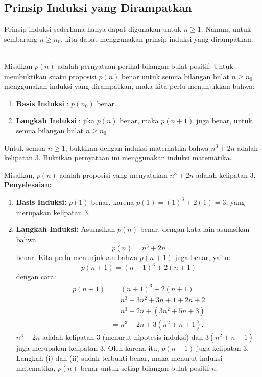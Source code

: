 \documentclass[11pt]{article}
\theoremstyle{definitionstyle}
\theoremstyle{theoremstyle}
\theoremstyle{examplestyle}
\begin{document}
\subsection{Prinsip Induksi yang Dirampatkan}
Prinsip induksi sederhana hanya dapat digunakan untuk $n \ge 1$. Namun, untuk sembarang $n \ge n_0$, kita dapat menggunakan prinsip induksi yang dirampatkan.
\begin{theorem} \hfill \\
    Misalkan $p(n)$ adalah pernyataan perihal bilangan bulat positif. Untuk membuktikan suatu proposisi $p(n)$ benar untuk semua bilangan bulat $n \ge n_0$ menggunakan induksi yang dirampatkan, maka kita perlu menunjukkan bahwa:
    \begin{enumerate}[left=0pt, itemsep=1.5pt, topsep=1.5pt, label=\roman*), leftmargin=1.5em]
        \item \textbf{Basis Induksi}    : $p(n_0)$ benar.
        \item \textbf{Langkah Induksi}  : jika $p(n)$ benar, maka $p(n+1)$ juga benar, untuk semua bilangan bulat $n \ge n_0$
    \end{enumerate}
\end{theorem}

\begin{example}
    Untuk semua $n \ge 1$, buktikan dengan induksi matematika bahwa $n^3 + 2n$ adalah kelipatan 3. Buktikan pernyataan ini menggunakan induksi matematika.
\end{example}
Misalkan, $p(n)$ adalah proposisi yang menyatakan $n^3 + 2n$ adalah kelipatan 3. \\
\textbf{Penyelesaian: }
\begin{enumerate}[left=0pt, itemsep=1.5pt, topsep=1.5pt, label=\roman*), leftmargin=1.5em]
    \item \textbf{Basis Induksi:} $p(1)$ benar, karena $p(1) = (1)^3 + 2(1) = 3$, yang merupakan kelipatan 3.
    \item \textbf{Langkah Induksi: } Asumsikan $p(n)$ benar, dengan kata lain asumsikan bahwa
    $$p(n) = n^3 + 2n$$
    benar. Kita perlu menunjukkan bahwa $p(n+1)$ juga benar, yaitu:
    $$p(n+1) = (n + 1)^3 + 2(n + 1)$$
    dengan cara:
    \begin{align*}
        p(n+1) &= (n + 1)^3 + 2(n + 1) \\
        &= n^3 + 3n^2 + 3n + 1 + 2n + 2 \\
        &= n^3 + 2n + (3n^2 + 5n + 3) \\ 
        &= n^3 + 2n + 3(n^2 + n + 1).
    \end{align*}
    $n^3 + 2n$ adalah kelipatan 3 (menurut hipotesis induksi) dan $3(n^2 + n + 1)$ juga merupakan kelipatan 3. Oleh karena itu, $p(n + 1)$ juga kelipatan 3. \\
    Langkah (i) dan (ii) sudah terbukti benar, maka menurut induksi matematika, $p(n)$ benar untuk setiap bilangan bulat positif $n$.
\end{enumerate}
\end{document}
